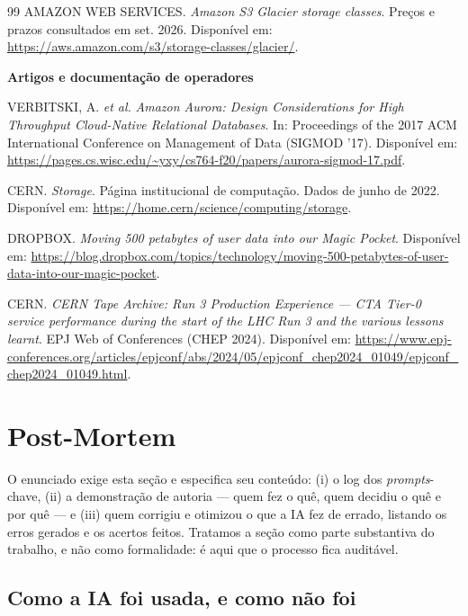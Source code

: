 \documentclass[11pt,a4paper]{article}
\begin{document}
\begin{thebibliography}{99}
 AMAZON WEB SERVICES. \textit{Amazon S3 Glacier storage classes}. Preços e
prazos consultados em set. 2026. Disponível em:
\url{https://aws.amazon.com/s3/storage-classes/glacier/}.

\bigskip
\bibitem[Artigos]{}\textbf{\large Artigos e documentação de operadores}

 VERBITSKI, A. \textit{et al.} \textit{Amazon Aurora: Design Considerations for
High Throughput Cloud-Native Relational Databases}. In: Proceedings of the 2017 ACM International
Conference on Management of Data (SIGMOD '17). Disponível em:
\url{https://pages.cs.wisc.edu/~yxy/cs764-f20/papers/aurora-sigmod-17.pdf}.

 CERN. \textit{Storage}. Página institucional de computação. Dados de junho de
2022. Disponível em: \url{https://home.cern/science/computing/storage}.

 DROPBOX. \textit{Moving 500 petabytes of user data into our Magic Pocket}.
Disponível em:
\url{https://blog.dropbox.com/topics/technology/moving-500-petabytes-of-user-data-into-our-magic-pocket}.

 CERN. \textit{CERN Tape Archive: Run 3 Production Experience --- CTA Tier-0 service
performance during the start of the LHC Run 3 and the various lessons learnt}. EPJ Web of
Conferences (CHEP 2024). Disponível em:
\url{https://www.epj-conferences.org/articles/epjconf/abs/2024/05/epjconf_chep2024_01049/epjconf_chep2024_01049.html}.

\end{thebibliography}

\clearpage
\section{Post-Mortem}
\label{sec:postmortem}

O enunciado exige esta seção e especifica seu conteúdo: (i) o log dos \textit{prompts}-chave, (ii) a
demonstração de autoria --- quem fez o quê, quem decidiu o quê e por quê --- e (iii) quem corrigiu e
otimizou o que a IA fez de errado, listando os erros gerados e os acertos feitos. Tratamos a seção
como parte substantiva do trabalho, e não como formalidade: é aqui que o processo fica auditável.

\subsection{Como a IA foi usada, e como não foi}
\end{document}
